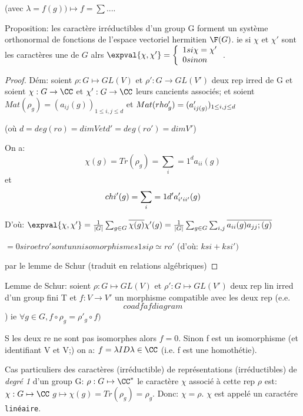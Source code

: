 (avec $\lambda = f(g)) \mapsto  f=\sum ....$


Proposition: les caractère irréductibles d'un group G forment un système orthonormal de fonctions de l'espace vectoriel hermitien $\F(G)$. ie si $\chi$ et $\chi'$ sont les caractères une de $G$ alrs $\expval{\chi, \chi'}=\left\{\begin{array}{l} 1 si \chi=\chi'\\0 sinon \end{array}\right.$.

\begin{proof}
	
Dém: soient $\rho:G\mapsto GL(V)$ et $\rho':G \rightarrow GL(V')$ deux rep irred de G et soient $\chi:G \rightarrow \CC$ et $\chi':G \rightarrow \CC$ leurs cancients associés; et soient $Mat(\rho_g)=(a_{ij}(g))_{1\leq i,j\leq d}$ et $Mat(\\rho'_g)=(a'_{ij(g)})_{1\leq i,j\leq d}$

(où $d=deg(ro)=dim V et d'=deg(ro')=dimV'$)

On a:
$$\chi(g)=Tr(\rho_g)=\sum_i=1^d a_{ii}(g)$$ et $$\\chi'(g)=\sum _i=1d' a'_{i'ii'}(g)$$




D'où: $\expval{\chi,\chi'}=\frac 1{|G|}\sum_{g\in G}\overline{\chi(g)} \chi'(g)=\frac 1{|G|}\sum_{g\in G}\sum_{i,j}\overline{a_{ii}(g)a_{jj};(g)}$


$=0 si ro et ro' sont unn isomorphismes 1 si \rho\simeq ro'$ (d'où: $ksi+ksi')$


par le lemme de Schur (traduit en relations algébriques)
\end{proof}


Lemme de Schur: soient $\rho: G\mapsto GL(V)$ et $\rho':G\mapsto GL(V')$ deux rep lin irred d'un group fini T et $f:V \rightarrow  V'$ un morphisme compatible avec les deux rep (e.e. $$coadfaf diagram$$)  ie $\forall g\in G, f\circ \rho_g=\rho'_g\circ f )$

S les deux re ne sont pas isomorphes alors $f=0$. Sinon f est un isomorphisme (et identifiant V et V;) on a: $f=\lambda ID \lambda\in \CC$ (i.e. f est une homothétie).

\begin{remark}
	
	Cas particuliers des caractères (irréductible) de représentations (irréductibles) de \emph{degré 1} d'un group G:
	$\rho:G\mapsto\CC^\ast$ le caractère $\chi$ associé à cette rep $\rho$ est: $\chi:G\mapsto \CC$ $g\mapsto \chi(g)=Tr(\rho_g)=\rho_g$. Donc: $\chi=\rho$. $\chi$ est appelé un caractére \texttt{linéaire}.
\end{remark}


